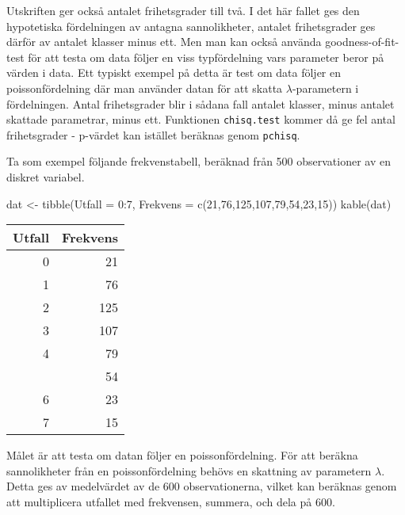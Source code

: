 \documentclass[
]{book}
\newenvironment{Shaded}{\begin{snugshade}}{\end{snugshade}}
\newcommand{\AttributeTok}[1]{\textcolor[rgb]{0.77,0.63,0.00}{#1}}
\newcommand{\DecValTok}[1]{\textcolor[rgb]{0.00,0.00,0.81}{#1}}
\newcommand{\FunctionTok}[1]{\textcolor[rgb]{0.00,0.00,0.00}{#1}}
\newcommand{\NormalTok}[1]{#1}
\newcommand{\OtherTok}[1]{\textcolor[rgb]{0.56,0.35,0.01}{#1}}
\newcommand{\SpecialCharTok}[1]{\textcolor[rgb]{0.00,0.00,0.00}{#1}}
\theoremstyle{definition}
\theoremstyle{definition}
\theoremstyle{definition}
\theoremstyle{definition}
\theoremstyle{remark}
\begin{document}
Utskriften ger också antalet frihetsgrader till två. I det här fallet ges den hypotetiska fördelningen av antagna sannolikheter, antalet frihetsgrader ges därför av antalet klasser minus ett. Men man kan också använda goodness-of-fit-test för att testa om data följer en viss typfördelning vars parameter beror på värden i data. Ett typiskt exempel på detta är test om data följer en poissonfördelning där man använder datan för att skatta \(\lambda\)-parametern i fördelningen. Antal frihetsgrader blir i sådana fall antalet klasser, minus antalet skattade parametrar, minus ett. Funktionen \texttt{chisq.test} kommer då ge fel antal frihetsgrader - p-värdet kan istället beräknas genom \texttt{pchisq}.

Ta som exempel följande frekvenstabell, beräknad från 500 observationer av en diskret variabel.

\begin{Shaded}
\begin{Highlighting}[]
\NormalTok{dat }\OtherTok{\textless{}{-}} \FunctionTok{tibble}\NormalTok{(}\AttributeTok{Utfall =} \DecValTok{0}\SpecialCharTok{:}\DecValTok{7}\NormalTok{, }
              \AttributeTok{Frekvens =} \FunctionTok{c}\NormalTok{(}\DecValTok{21}\NormalTok{,}\DecValTok{76}\NormalTok{,}\DecValTok{125}\NormalTok{,}\DecValTok{107}\NormalTok{,}\DecValTok{79}\NormalTok{,}\DecValTok{54}\NormalTok{,}\DecValTok{23}\NormalTok{,}\DecValTok{15}\NormalTok{))}
\FunctionTok{kable}\NormalTok{(dat)}
\end{Highlighting}
\end{Shaded}

\begin{table}
\centering
\begin{tabular}[t]{rr}
\toprule
Utfall & Frekvens\\
\midrule
0 & 21\\
1 & 76\\
2 & 125\\
3 & 107\\
4 & 79\\
\addlinespace
5 & 54\\
6 & 23\\
7 & 15\\
\bottomrule
\end{tabular}
\end{table}

Målet är att testa om datan följer en poissonfördelning. För att beräkna sannolikheter från en poissonfördelning behövs en skattning av parametern \(\lambda\). Detta ges av medelvärdet av de 600 observationerna, vilket kan beräknas genom att multiplicera utfallet med frekvensen, summera, och dela på 600.
\end{document}
